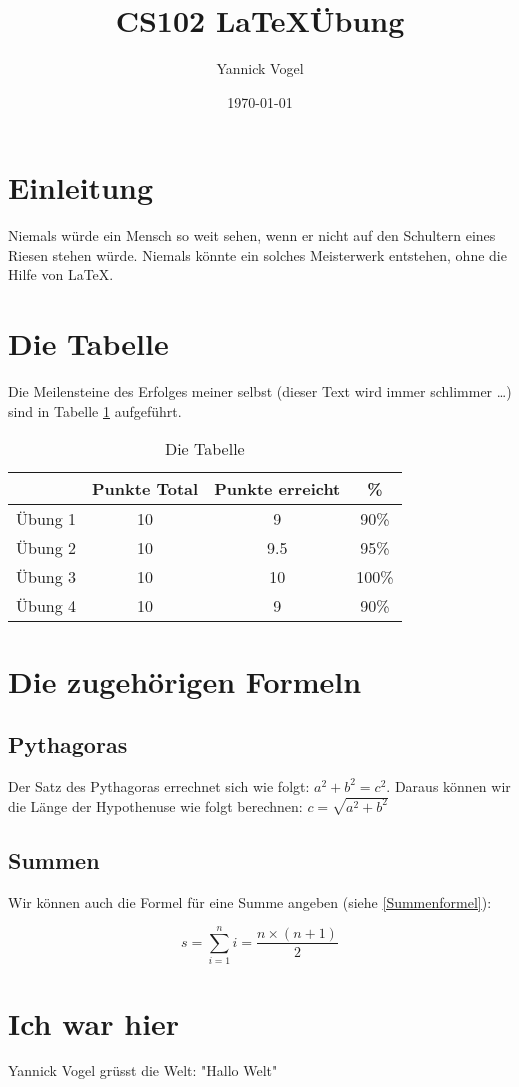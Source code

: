 \documentclass[11pt,a4paper]{article}
\date{\today}
\author{Yannick Vogel}
\title{CS102 \LaTeX Übung}
\begin{document}
\maketitle
\tableofcontents
\section{Einleitung}
Niemals würde ein Mensch so weit sehen, wenn er nicht auf den Schultern eines Riesen stehen würde. Niemals könnte ein solches Meisterwerk entstehen, ohne die Hilfe von \LaTeX .
\section{Die Tabelle}
Die Meilensteine des Erfolges meiner selbst (dieser Text wird immer schlimmer \dots ) sind in Tabelle \ref{tab:DieTabelle} aufgeführt.  

\begin{table}[h]
\centering
\begin{tabular}{c|c|c|c}
{} & Punkte Total & Punkte erreicht & \% \\
\hline
Übung 1 & 10 & 9 & 90\% \\
Übung 2 & 10 & 9.5 & 95\% \\
Übung 3 & 10 & 10 & 100\% \\
Übung 4 & 10 & 9 & 90\% \\
\end{tabular}
\caption{Die Tabelle}
\label{tab:DieTabelle}
\end{table}
\section{Die zugehörigen Formeln}
\subsection{Pythagoras}
Der Satz des Pythagoras errechnet sich wie folgt: $a^2 + b^2 = c^2$. Daraus können
wir die Länge der Hypothenuse wie folgt berechnen: $c = \sqrt{a^2 + b^2}$
\subsection{Summen}
Wir können auch die Formel für eine Summe angeben (siehe \ref{Summenformel}):

\begin{equation}
\label{Summenformel}
s = \sum_{i=1}^{n}i= \frac{n\times(n+1)}{2}
\end{equation}
\section{Ich war hier}
Yannick Vogel grüsst die Welt: "Hallo Welt"
\end{document}
